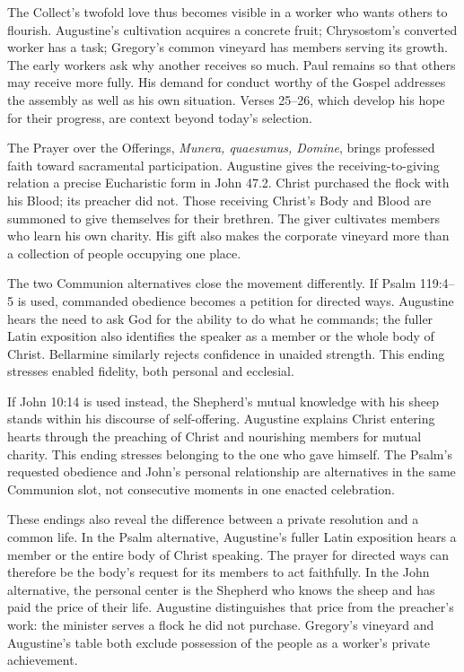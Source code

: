 The Collect's twofold love thus becomes visible in a worker who wants others to flourish. Augustine's cultivation acquires a concrete fruit; Chrysostom's converted worker has a task; Gregory's common vineyard has members serving its growth. The early workers ask why another receives so much. Paul remains so that others may receive more fully. His demand for conduct worthy of the Gospel addresses the assembly as well as his own situation. Verses 25--26, which develop his hope for their progress, are context beyond today's selection.

The Prayer over the Offerings, \textit{Munera, quaesumus, Domine}, brings professed faith toward sacramental participation. Augustine gives the receiving-to-giving relation a precise Eucharistic form in John 47.2. Christ purchased the flock with his Blood; its preacher did not. Those receiving Christ's Body and Blood are summoned to give themselves for their brethren. The giver cultivates members who learn his own charity. His gift also makes the corporate vineyard more than a collection of people occupying one place.

The two Communion alternatives close the movement differently. If Psalm 119:4--5 is used, commanded obedience becomes a petition for directed ways. Augustine hears the need to ask God for the ability to do what he commands; the fuller Latin exposition also identifies the speaker as a member or the whole body of Christ. Bellarmine similarly rejects confidence in unaided strength. This ending stresses enabled fidelity, both personal and ecclesial.

If John 10:14 is used instead, the Shepherd's mutual knowledge with his sheep stands within his discourse of self-offering. Augustine explains Christ entering hearts through the preaching of Christ and nourishing members for mutual charity. This ending stresses belonging to the one who gave himself. The Psalm's requested obedience and John's personal relationship are alternatives in the same Communion slot, not consecutive moments in one enacted celebration.

These endings also reveal the difference between a private resolution and a common life. In the Psalm alternative, Augustine's fuller Latin exposition hears a member or the entire body of Christ speaking. The prayer for directed ways can therefore be the body's request for its members to act faithfully. In the John alternative, the personal center is the Shepherd who knows the sheep and has paid the price of their life. Augustine distinguishes that price from the preacher's work: the minister serves a flock he did not purchase. Gregory's vineyard and Augustine's table both exclude possession of the people as a worker's private achievement.

